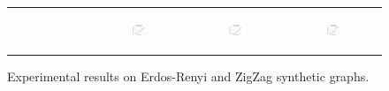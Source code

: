 \begin{figure}[ht]
\begin{tabular}{cccc}
\begin{subfigure}[b]{0.22\textwidth}
			\caption{}
			\label{appfig:validated_CC2G_bigsynthetic_maxgraphcut}
	  \end{subfigure} &
	  \begin{subfigure}[b]{0.22\textwidth}
	  	\includegraphics[width=110pt]{images/validated_CC2G_bigsynthetic_setcover.png}
			\caption{}
			\label{appfig:validated_CC2G_bigsynthetic_setcover}
	  \end{subfigure} &
	  \begin{subfigure}[b]{0.22\textwidth}
	  	\includegraphics[width=110pt]{images/validated_CC2G_zigzag_maxgraphcut.png}
			\caption{}
			\label{appfig:validated_CC2G_zigzag_maxgraphcut}
	  \end{subfigure} &
	  \begin{subfigure}[b]{0.22\textwidth}
	  	\includegraphics[width=110pt]{images/validated_CC2G_zigzag_setcover.png}
			\caption{}
			\label{appfig:validated_CC2G_zigzag_setcover}
	  \end{subfigure} \\
  \end{tabular}
  \caption{Experimental results on Erdos-Renyi and ZigZag synthetic graphs.}
\end{figure}


